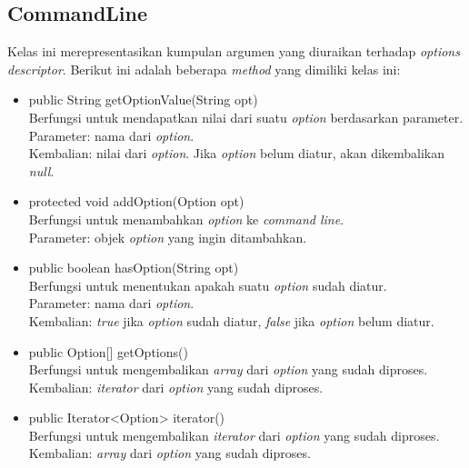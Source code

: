 \subsection{CommandLine}
\label{subsec:commandline}
Kelas ini merepresentasikan kumpulan argumen yang diuraikan terhadap \textit{options descriptor}.
Berikut ini adalah beberapa \textit{method} yang dimiliki kelas ini: 
\begin{itemize}
\item public String getOptionValue(String opt)\\
Berfungsi untuk mendapatkan nilai dari suatu \textit{option} berdasarkan parameter.\\
Parameter: nama dari \textit{option}.\\
Kembalian: nilai dari \textit{option}. Jika \textit{option} belum diatur, akan dikembalikan \textit{null}.
\item protected void addOption(Option opt)\\
Berfungsi untuk menambahkan \textit{option} ke \textit{command line}.\\
Parameter: objek \textit{option} yang ingin ditambahkan.
\item public boolean hasOption(String opt)\\
Berfungsi untuk menentukan apakah suatu \textit{option} sudah diatur.\\
Parameter: nama dari \textit{option}.\\
Kembalian: \textit{true} jika \textit{option} sudah diatur, \textit{false} jika \textit{option} belum diatur.
\item public Option[] getOptions()\\
Berfungsi untuk mengembalikan \textit{array} dari \textit{option} yang sudah diproses.\\ 
Kembalian: \textit{iterator} dari \textit{option} yang sudah diproses.
\item public Iterator<Option> iterator()\\
Berfungsi untuk mengembalikan \textit{iterator} dari \textit{option} yang sudah diproses.\\ 
Kembalian: \textit{array} dari \textit{option} yang sudah diproses.

\end{itemize}

